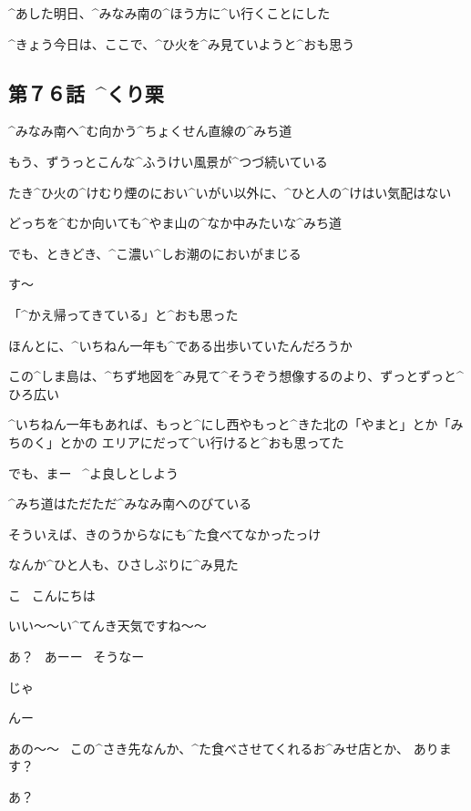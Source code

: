 \page[140]
\Alpha ^{あした}{明日}、^{みなみ}{南}の^{ほう}{方}に^{い}{行}くことにした

\Alpha ^{きょう}{今日}は、ここで、^{ひ}{火}を^{み}{見}ていようと^{おも}{思}う


\subsection{第７６話\ ^{くり}{栗}}

\page[142]
\Alpha ^{みなみ}{南}へ^{む}{向}かう^{ちょくせん}{直線}の^{みち}{道}

\Alpha もう、ずうっとこんな^{ふうけい}{風景}が^{つづ}{続}いている

\Alpha たき^{ひ}{火}の^{けむり}{煙}のにおい^{いがい}{以外}に、^{ひと}{人}の^{けはい}{気配}はない

\page[143]
\Alpha どっちを^{むか}{向}いても^{やま}{山}の^{なか}{中}みたいな^{みち}{道}

\Alpha でも、ときどき、^{こ}{濃}い^{しお}{潮}のにおいがまじる

\Alpha す〜

\Alpha 「^{かえ}{帰}ってきている」と^{おも}{思}った

\Alpha ほんとに、^{いちねん}{一年}も^{である}{出歩}いていたんだろうか

\page[144]
\Alpha この^{しま}{島}は、^{ちず}{地図}を^{み}{見}て^{そうぞう}{想像}するのより、ずっとずっと^{ひろ}{広}い

\Alpha ^{いちねん}{一年}もあれば、もっと^{にし}{西}やもっと^{きた}{北}の「やまと」とか「みちのく」とかの
エリアにだって^{い}{行}けると^{おも}{思}ってた

\Alpha でも、まー
\ ^{よ}{良}しとしよう

\page[145]
\Alpha ^{みち}{道}はただただ^{みなみ}{南}へのびている

\page[146]
\Alpha そういえば、きのうからなにも^{た}{食}べてなかったっけ

\Alpha なんか^{ひと}{人}も、ひさしぶりに^{み}{見}た

\page[147]
\Alpha こ
\ こんにちは

\Alpha いい〜〜い^{てんき}{天気}ですね〜〜

\Person あ？
\ あーー
\ そうなー

\Alpha じゃ

\Person んー

\Alpha あの〜〜
\ この^{さき}{先}なんか、^{た}{食}べさせてくれるお^{みせ}{店}とか、
あります？

\Person あ？

